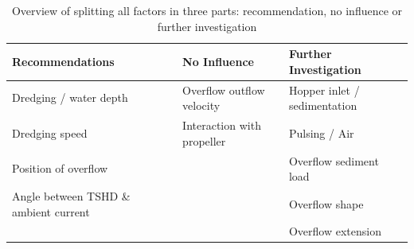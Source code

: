\begin{table}[ht!]
\centering
\caption{Overview of splitting all factors in three parts: recommendation, no influence or further investigation}
\label{tab:Part_factors}
\begin{tabular}{|l|l|l|}
\hline
\textbf{Recommendations}              & \textbf{No Influence}      & \textbf{Further Investigation} \\ \hline
Dredging / water depth                & Overflow outflow velocity  & Hopper inlet / sedimentation   \\ \hline
Dredging speed                        & Interaction with propeller & Pulsing / Air                  \\ \hline
Position of overflow                  &                            & Overflow sediment load         \\ \hline
Angle between TSHD \& ambient current &                            & Overflow shape                 \\ \hline
                                      &                            & Overflow extension             \\ \hline
\end{tabular}
\end{table}



